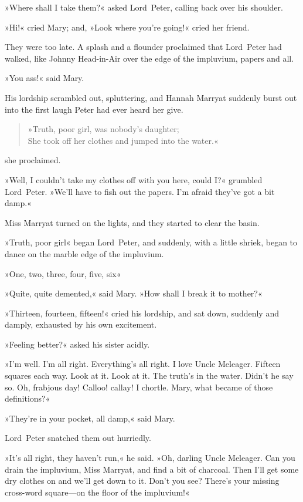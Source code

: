 »Where shall I take them?« asked Lord~Peter, calling back over his shoulder.

»Hi!« cried Mary; and, »Look where you're going!« cried her friend.

They were too late. A splash and a flounder proclaimed that Lord~Peter had walked, like Johnny Head-in-Air over the edge of the impluvium, papers and all.

»You ass!« said Mary.

His lordship scrambled out, spluttering, and Hannah Marryat suddenly burst out into the first laugh Peter had ever heard her give.

\begin{quote}
»Truth, poor girl, was nobody's daughter;\\
She took off her clothes and jumped into the water.«
\end{quote}
she proclaimed.

»Well, I couldn't take my clothes off with you here, could I\@?« grumbled Lord~Peter. »We'll have to fish out the papers. I'm afraid they've got a bit damp.«

Miss Marryat turned on the lights, and they started to clear the basin.

»Truth, poor girl\longdash« began Lord~Peter, and suddenly, with a little shriek, began to dance on the marble edge of the impluvium.

»One, two, three, four, five, six\longdash«

»Quite, quite demented,« said Mary. »How shall I break it to mother?«

»Thirteen, fourteen, fifteen!« cried his lordship, and sat down, suddenly and damply, exhausted by his own excitement.

»Feeling better?« asked his sister acidly.

»I'm well. I'm all right. Everything's all right. I love Uncle Meleager. Fifteen squares each way. Look at it. Look at it. The truth's in the water. Didn't he say so. Oh, frabjous day! Calloo! callay! I chortle. Mary, what became of those definitions?«

»They're in your pocket, all damp,« said Mary.

Lord~Peter snatched them out hurriedly.

»It's all right, they haven't run,« he said. »Oh, darling Uncle Meleager. Can you drain the impluvium, Miss Marryat, and find a bit of charcoal. Then I'll get some dry clothes on and we'll get down to it. Don't you see? There's your missing cross-word square—on the floor of the impluvium!«

